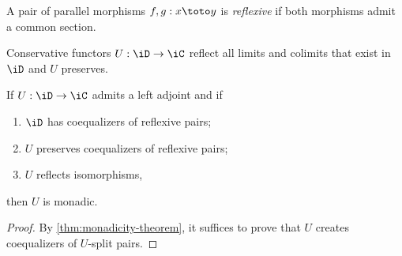 \documentclass{amsart}
\begin{document}
\begin{defn}
  A pair of parallel morphisms $f,g : x \toto y$ is \emph{reflexive} if both morphisms admit a common section.
\end{defn}

\begin{lem}
  Conservative functors $U : \iD \to \iC$ reflect all limits and colimits that exist in $\iD$ and $U$ preserves.
\end{lem}

\begin{thm}
  If $U : \iD \to \iC$ admits a left adjoint and if
  \begin{enumerate}
  \item $\iD$ has coequalizers of reflexive pairs;
  \item $U$ preserves coequalizers of reflexive pairs;
  \item $U$ reflects isomorphisms,
  \end{enumerate}
  then $U$ is monadic.
\end{thm}
\begin{proof}
  By \cref{thm:monadicity-theorem}, it suffices to prove that $U$ creates coequalizers of $U$-split pairs.
\end{proof}



\end{document}

